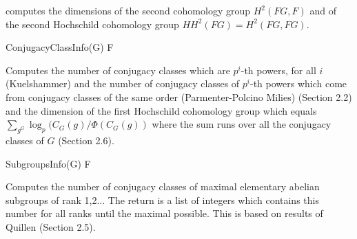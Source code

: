 computes the dimensions of the second cohomology group $H^2(FG, F)$ and of the second
Hochschild cohomology group $HH^2(FG) = H^2(FG, FG)$.

\> ConjugacyClassInfo(G) F

Computes the number of conjugacy classes which are $p^i$-th powers, for all $i$ (Kuelshammer) and
the number of conjugacy classes of $p^i$-th powers which come from conjugacy classes of the same order
 (Parmenter-Polcino Milies) \cite{HS06}(Section 2.2) and the dimension of the first Hochschild 
 cohomology group which equals $\sum_{g^G} \log_p(C_G(g)/\Phi(C_G(g))$ where the sum runs over
 all the conjugacy classes of $G$ \cite{HS06}(Section 2.6). 
 
\> SubgroupsInfo(G) F

Computes the number of conjugacy classes of maximal elementary abelian subgroups of rank 1,2...
The return is a list of integers which contains this number for all ranks until the maximal possible.
This is based on results of Quillen \cite{HS06}(Section 2.5).


